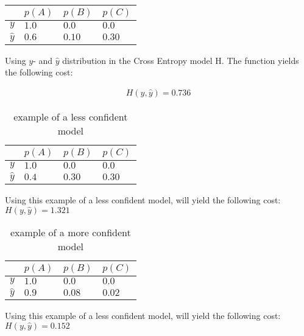 \begin{table}[h]
\centering
\begin{tabular}{|l|l|l|l|}
\hline
 		  & $p(A)$ & $p(B)$ & $p(C)$ \\ \hline
$y$ 	  & $1.0$  & $0.0$  & $0.0 $ \\ \hline
$\hat{y}$ & $0.6$  & $0.10$ & $0.30$ \\ \hline
\end{tabular}
\end{table}

Using $y$- and $\hat{y}$ distribution in the Cross Entropy model H. The function yields the following cost:

\begin{align}
	H(y,\hat{y}) = 0.736
\end{align}

\begin{table}[h]
\centering
\begin{tabular}{|l|l|l|l|}
\hline
 		  & $p(A)$ & $p(B)$ & $p(C)$ \\ \hline
$y$ 	  & $1.0$  & $0.0$  & $0.0 $ \\ \hline
$\hat{y}$ & $0.4$  & $0.30$ & $0.30$ \\ \hline
\end{tabular}
\caption{example of a less confident model}\label{Baseline:before}
\end{table}

\noindent
Using this example of a less confident model, will yield the following cost: $H(y,\hat{y}) = 1.321$\\

\begin{table}[h]
\centering
\begin{tabular}{|l|l|l|l|}
\hline
 		  & $p(A)$ & $p(B)$ & $p(C)$ \\ \hline
$y$ 	  & $1.0$  & $0.0$  & $0.0 $ \\ \hline
$\hat{y}$ & $0.9$  & $0.08$ & $0.02$ \\ \hline
\end{tabular}
\caption{example of a more confident model}\label{Baseline:before}
\end{table}

\noindent
Using this example of a less confident model, will yield the following cost: $H(y,\hat{y}) = 0.152$\\

